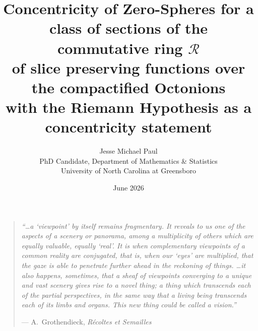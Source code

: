\documentclass[11pt]{article}
\title{Concentricity of Zero-Spheres for a class of sections of the commutative ring $\mathcal R$\\ of slice preserving functions
over the compactified Octonions\\[0.4em]
\large
with the Riemann Hypothesis as a concentricity statement}
\author{Jesse Michael Paul\\[2pt]
{\normalsize PhD Candidate, Department of Mathematics \& Statistics}\\
{\normalsize University of North Carolina at Greensboro}}
\date{June 2026}
\theoremstyle{plain}
\theoremstyle{definition}
\theoremstyle{remark}
\begin{document}
\maketitle

\begin{quote}\small\itshape
``\dots a `viewpoint' by itself remains fragmentary. It reveals to us one of the aspects of a
scenery or panorama, among a multiplicity of others which are equally valuable, equally `real'.
It is when complementary viewpoints of a common reality are conjugated, that is, when our `eyes'
are multiplied, that the gaze is able to penetrate further ahead in the reckoning of things.
\dots it also happens, sometimes, that a sheaf of viewpoints converging to a unique and vast
scenery gives rise to a novel thing; a thing which transcends each of the partial perspectives,
in the same way that a living being transcends each of its limbs and organs. This new thing could
be called a vision.''
\begin{flushright}\upshape --- A.\ Grothendieck, \emph{R\'ecoltes et Semailles}\end{flushright}
\end{quote}
\end{document}
